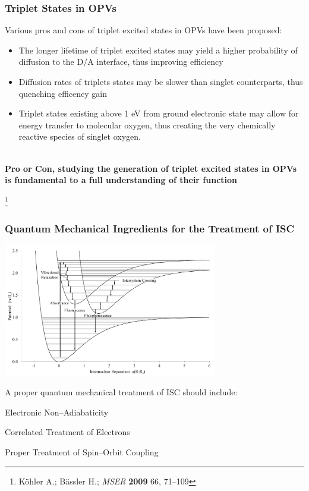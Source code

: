 \documentclass[usepdftitle=false,10pt]{beamer}
\newcommand{\cmark}{\color{green} \ding{51}}%
\newcommand{\xmark}{\color{red} \ding{55}}%
\newcommand{\done}{\rlap{$\square$}{\raisebox{2pt}{\large\hspace{1pt}\cmark}}%
\hspace{-2.5pt}}
\newcommand{\wontfix}{\rlap{$\square$}{\large\hspace{1pt}\xmark}}
\newcommand\blfootnote[1]{%
  \begingroup
  \renewcommand\thefootnote{}\footnote{#1}%
  \addtocounter{footnote}{-1}%
  \endgroup
}
\begin{document}
\begin{frame}
  \frametitle{Triplet States in OPVs}

  Various pros and cons of triplet excited states in OPVs have been proposed:
  \begin{itemize}
    \item[\done] The longer lifetime of triplet excited states may yield a higher probability of diffusion
          to the D/A interface, thus improving efficiency
    \item[\wontfix] Diffusion rates of triplets states may be slower than singlet counterparts, thus quenching
          efficency gain
    \item[\wontfix] Triplet states existing above 1 eV from ground electronic state may allow for energy transfer
          to molecular oxygen, thus creating the very chemically reactive species of singlet oxygen.
  \end{itemize}

  \begin{center}
  ~\\
  {\Large \bf Pro or Con, studying the generation of triplet excited states in OPVs is fundamental to a full understanding
  of their function}
  \end{center}

  \blfootnote{\tiny K\"{o}hler A.; B\"{a}ssler H.; \emph{MSER} \textbf{2009} 66, 71--109}
\end{frame}

\begin{frame}
  \frametitle{Quantum Mechanical Ingredients for the Treatment of ISC}
  \begin{center}
  \includegraphics[width=0.7\textwidth]{ISC} 
  \end{center}
  \vspace{-0.5cm}
  A proper quantum mechanical treatment of ISC should include:\\
  \begin{mylist}
    \item Electronic Non--Adiabaticity
    \item Correlated Treatment of Electrons
    \item Proper Treatment of Spin--Orbit Coupling
  \end{mylist}
\end{frame}
\end{document}
